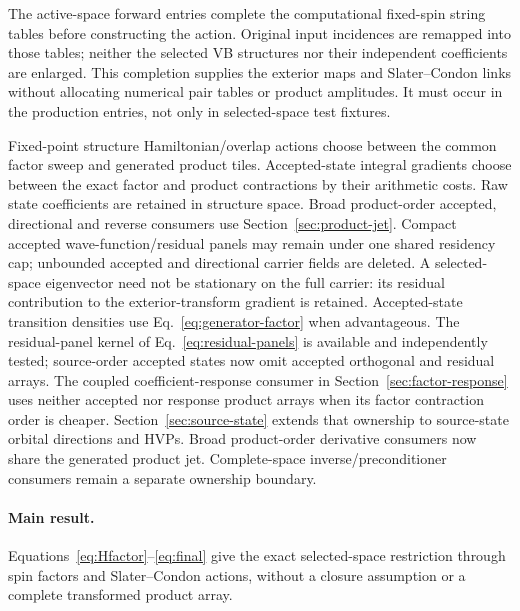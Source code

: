 \documentclass[11pt,a4paper]{article}
\begin{document}
The active-space forward entries complete the computational fixed-spin
string tables before constructing the action. Original input incidences are
remapped into those tables; neither the selected VB structures nor their
independent coefficients are enlarged. This completion supplies the exterior
maps and Slater--Condon links without allocating numerical pair tables or
product amplitudes. It must occur in the production entries, not only in
selected-space test fixtures.

Fixed-point structure Hamiltonian/overlap actions choose between the common
factor sweep and generated product tiles. Accepted-state integral gradients
choose between the exact factor and
product contractions by their arithmetic costs. Raw state coefficients are
retained in structure space. Broad product-order accepted, directional and
reverse consumers use Section~\ref{sec:product-jet}. Compact accepted
wave-function/residual panels may remain under one shared residency cap;
unbounded accepted and directional carrier fields are deleted.
A selected-space eigenvector need not be
stationary on the full carrier: its residual contribution to the
exterior-transform gradient is retained.
Accepted-state transition densities use Eq.~\eqref{eq:generator-factor}
when advantageous. The residual-panel kernel of
Eq.~\eqref{eq:residual-panels} is available and independently tested;
source-order accepted states now omit accepted orthogonal and residual arrays.
The coupled coefficient-response consumer in
Section~\ref{sec:factor-response} uses neither accepted nor response product
arrays when its factor contraction order is cheaper. Section~\ref{sec:source-state}
extends that ownership to source-state orbital directions and HVPs. Broad
product-order derivative consumers now share the generated product jet.
Complete-space inverse/preconditioner consumers remain a separate ownership boundary.

\paragraph{Main result.}
Equations~\eqref{eq:Hfactor}--\eqref{eq:final} give the exact
selected-space restriction through spin factors and Slater--Condon actions,
without a closure assumption or a complete transformed product array.
\end{document}
